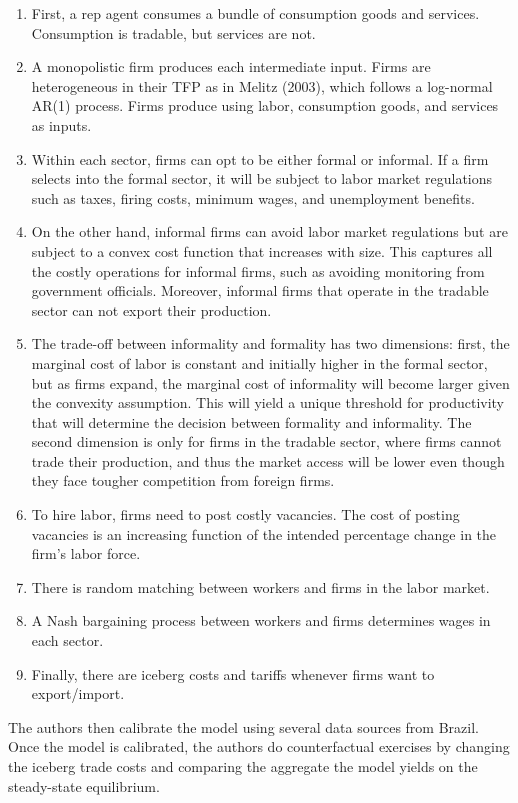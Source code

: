 \documentclass[12pt,oneside,reqno]{amsart}
\begin{document}
\begin{enumerate}[label=\arabic*.]
    \item First, a rep agent consumes a bundle of consumption goods and services. Consumption is tradable, but services are not.
    \item A monopolistic firm produces each intermediate input. Firms are heterogeneous in their TFP as in Melitz (2003), which follows a log-normal AR(1) process. Firms produce using labor, consumption goods, and services as inputs.
    \item Within each sector, firms can opt to be either formal or informal. If a firm selects into the formal sector, it will be subject to labor market regulations such as taxes, firing costs, minimum wages, and unemployment benefits.
    \item On the other hand, informal firms can avoid labor market regulations but are subject to a convex cost function that increases with size. This captures all the costly operations for informal firms, such as avoiding monitoring from government officials. Moreover, informal firms that operate in the tradable sector can not export their production.
    \item The trade-off between informality and formality has two dimensions: first, the marginal cost of labor is constant and initially higher in the formal sector, but as firms expand, the marginal cost of informality will become larger given the convexity assumption. This will yield a unique threshold for productivity that will determine the decision between formality and informality. The second dimension is only for firms in the tradable sector, where firms cannot trade their production, and thus the market access will be lower even though they face tougher competition from foreign firms.
    \item  To hire labor, firms need to post costly vacancies. The cost of posting vacancies is an increasing function of the intended percentage change in the firm's labor force. 
    \item There is random matching between workers and firms in the labor market. 
    \item A Nash bargaining process between workers and firms determines wages in each sector. 
    \item Finally, there are iceberg costs and tariffs whenever firms want to export/import. 
\end{enumerate}
The authors then calibrate the model using several data sources from Brazil. Once the model is calibrated, the authors do counterfactual exercises by changing the iceberg trade costs and comparing the aggregate the model yields on the steady-state equilibrium. 
\end{document}
